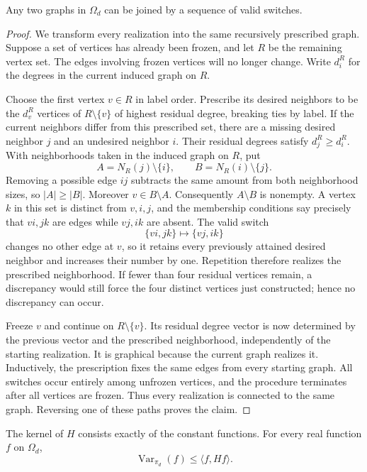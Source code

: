 \begin{lemma}\label{mix:connectivity}
Any two graphs in $\Omega_d$ can be joined by a sequence of valid switches.
\end{lemma}

\begin{proof}
We transform every realization into the same recursively prescribed
graph. Suppose a set of vertices has already been frozen, and let $R$ be
the remaining vertex set. The edges involving frozen vertices will no
longer change. Write $d_i^R$ for the degrees in the current induced graph
on $R$.

Choose the first vertex $v\in R$ in label order. Prescribe its desired
neighbors to be the $d_v^R$ vertices of $R\setminus\{v\}$ of highest
residual degree, breaking ties by label. If the current neighbors differ
from this prescribed set, there are a missing desired neighbor $j$ and
an undesired neighbor $i$. Their residual degrees satisfy
$d_j^R\ge d_i^R$. With neighborhoods taken in the induced graph on $R$,
put
\[
A=N_R(j)\setminus\{i\},\qquad
B=N_R(i)\setminus\{j\}.
\]
Removing a possible edge $ij$ subtracts the same amount from both
neighborhood sizes, so $|A|\ge |B|$. Moreover $v\in B\setminus A$.
Consequently $A\setminus B$ is nonempty. A vertex $k$ in this set is
distinct from $v,i,j$, and the membership conditions say precisely that
$vi,jk$ are edges while $vj,ik$ are absent. The valid switch
\[
\{vi,jk\}\longmapsto\{vj,ik\}
\]
changes no other edge at $v$, so it retains every previously attained
desired neighbor and increases their number by one. Repetition therefore
realizes the prescribed neighborhood. If fewer than four residual
vertices remain, a discrepancy would still force the four distinct
vertices just constructed; hence no discrepancy can occur.

Freeze $v$ and continue on $R\setminus\{v\}$. Its residual degree vector
is now determined by the previous vector and the prescribed neighborhood,
independently of the starting realization. It is graphical because the
current graph realizes it. Inductively, the prescription fixes the same
edges from every starting graph. All switches occur entirely among
unfrozen vertices, and the procedure terminates after all vertices are
frozen. Thus every realization is connected to the same graph. Reversing
one of these paths proves the claim.
\end{proof}

\begin{corollary}\label{mix:poincare}
The kernel of $H$ consists exactly of the constant functions. For every
real function $f$ on $\Omega_d$,
\begin{equation}\label{mix:H-poincare}
\operatorname{Var}_{\pi_d}(f)\le \langle f,Hf\rangle.
\end{equation}
\end{corollary}

